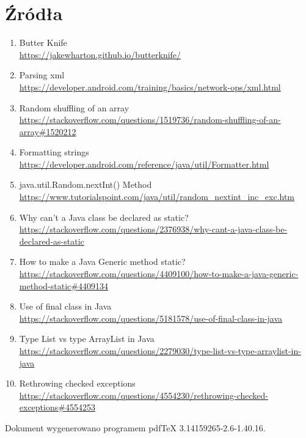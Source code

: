 \documentclass[12pt, a4paper]{article}
\begin{document}
\section{Źródła}
\begin{enumerate}
\item Butter Knife\\
\url{https://jakewharton.github.io/butterknife/}
\item Parsing xml\\
\url{https://developer.android.com/training/basics/network-ops/xml.html}
\item Random shuffling of an array\\
\url{https://stackoverflow.com/questions/1519736/random-shuffling-of-an-array#1520212}
\item Formatting strings\\
\url{https://developer.android.com/reference/java/util/Formatter.html}
\item java.util.Random.nextInt() Method\\
\url{https://www.tutorialspoint.com/java/util/random_nextint_inc_exc.htm}
\item Why can't a Java class be declared as static?\\
\url{https://stackoverflow.com/questions/2376938/why-cant-a-java-class-be-declared-as-static}
\item How to make a Java Generic method static?\\
\url{https://stackoverflow.com/questions/4409100/how-to-make-a-java-generic-method-static#4409134}
\item Use of final class in Java\\
\url{https://stackoverflow.com/questions/5181578/use-of-final-class-in-java}
\item Type List vs type ArrayList in Java\\
\url{https://stackoverflow.com/questions/2279030/type-list-vs-type-arraylist-in-java}
\item Rethrowing checked exceptions\\
\url{https://stackoverflow.com/questions/4554230/rethrowing-checked-exceptions#4554253}
\end{enumerate}
Dokument wygenerowano programem pdfTeX 3.14159265-2.6-1.40.16.
\end{document}
